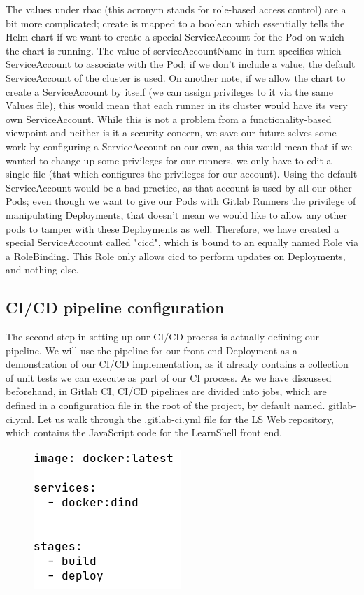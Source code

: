 \documentclass[thesis=B,english]{FITthesis}[2019/12/23]
\begin{document}
The values under rbac (this acronym stands for role-based access control) are a bit more complicated; create is mapped to a boolean which essentially tells the Helm chart if we want to create a special ServiceAccount for the Pod on which the chart is running. The value of serviceAccountName in turn specifies which ServiceAccount to associate with the Pod; if we don't include a value, the default ServiceAccount of the cluster is used. On another note, if we allow the chart to create a ServiceAccount by itself (we can assign privileges to it via the same Values file), this would mean that each runner in its cluster would have its very own ServiceAccount. While this is not a problem from a functionality-based viewpoint and neither is it a security concern, we save our future selves some work by configuring a ServiceAccount on our own, as this would mean that if we wanted to change up some privileges for our runners, we only have to edit a single file (that which configures the privileges for our account). Using the default ServiceAccount would be a bad practice, as that account is used by all our other Pods; even though we want to give our Pods with Gitlab Runners the privilege of manipulating Deployments, that doesn't mean we would like to allow any other pods to tamper with these Deployments as well. Therefore, we have created a special ServiceAccount called "cicd", which is bound to an equally named Role via a RoleBinding. This Role only allows cicd to perform updates on Deployments, and nothing else. 



\subsection{CI/CD pipeline configuration}

The second step in setting up our CI/CD process is actually defining our pipeline. We will use the pipeline for our front end Deployment as a demonstration of our CI/CD implementation, as it already contains a collection of unit tests we can execute as part of our CI process. As we have discussed beforehand, in Gitlab CI, CI/CD pipelines are divided into jobs, which are defined in a configuration file in the root of the project, by default named. gitlab-ci.yml. Let us walk through the .gitlab-ci.yml file for the LS Web repository, which contains the JavaScript code for the LearnShell front end.

\begin{figure}[H]
\centering
\hspace*{-0.6cm}
\includegraphics[scale=0.5]{gitlab-ci-stages}
\end{figure}
\end{document}

